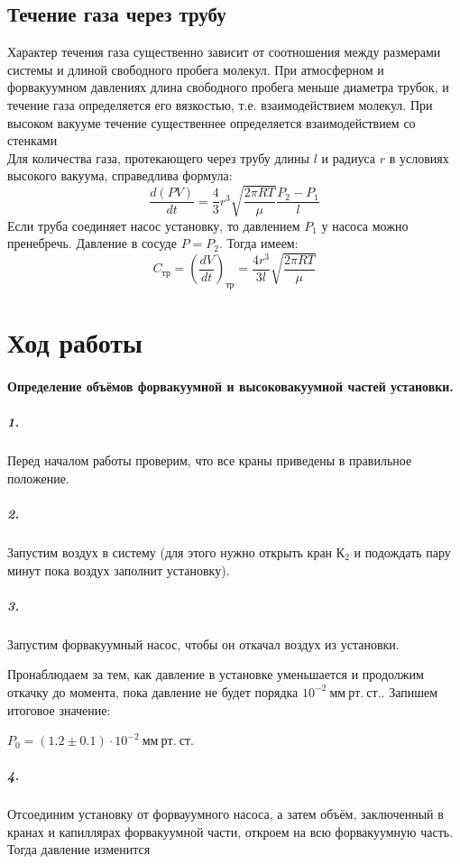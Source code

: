 \documentclass[a4paper,12pt]{article}
\begin{document}
\subsection*{Течение газа через трубу}
Характер течения газа существенно зависит от соотношения между размерами системы и длиной свободного пробега молекул. При атмосферном и форвакуумном давлениях  длина свободного пробега меньше диаметра трубок, и течение газа определяется его вязкостью, т.е. взаимодействием молекул. При высоком вакууме течение существеннее определяется взаимодействием со стенками \\
Для количества газа, протекающего через трубу длины $l$ и радиуса $r$ в условиях высокого вакуума, справедлива формула:
\begin{equation}
	\frac{d(PV)}{dt} = \frac{4}{3}r^3\sqrt{\frac{2\pi RT}{\mu}}\frac{P_2 - P_1}{l}
\end{equation}
Если труба соединяет насос установку, то давлением $P_1$ у насоса можно пренебречь. Давление в сосуде $P = P_2$. Тогда имеем:
\begin{equation}
C_\text{тр} = \left(\frac{dV}{dt}\right)_\text{тр} = \frac{4r^3}{3l}\sqrt{\frac{2\pi RT}{\mu}}
\end{equation}

\section*{Ход работы}

\paragraph{Определение объёмов форвакуумной и высоковакуумной частей установки.}

\subparagraph{1.} Перед началом работы проверим, что все краны приведены в правильное положение. 

\subparagraph{2.} Запустим воздух в систему (для этого нужно открыть кран $К_2$  и подождать пару минут пока воздух заполнит установку). 

\subparagraph{3.} Запустим форвакуумный насос, чтобы он откачал воздух из установки. 

Пронаблюдаем за тем, как давление в установке уменьшается и продолжим откачку до момента, пока давление не будет порядка $ 10^{-2}~мм~рт.~ ст.$. Запишем итоговое значение: 

$
P_0 = (1.2 \pm 0.1) \cdot 10^{-2}~мм~рт.~ ст.
$

\subparagraph{4.} Отсоединим установку от форвауумного насоса, а затем объём, заключенный в кранах и капиллярах форвакуумной части, откроем на всю форвакуумную часть. Тогда давление изменится
\end{document}
